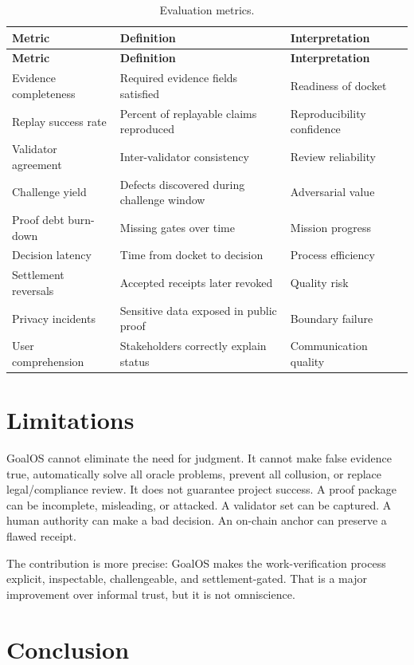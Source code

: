 \begin{longtable}{p{} p{} p{}}
\caption{Evaluation metrics.}\label{tab:metrics}\\
\toprule
\textbf{Metric} & \textbf{Definition} & \textbf{Interpretation}\\
\midrule
\endfirsthead
\toprule
\textbf{Metric} & \textbf{Definition} & \textbf{Interpretation}\\
\midrule
\endhead
Evidence completeness & Required evidence fields satisfied & Readiness of docket \\
Replay success rate & Percent of replayable claims reproduced & Reproducibility confidence \\
Validator agreement & Inter-validator consistency & Review reliability \\
Challenge yield & Defects discovered during challenge window & Adversarial value \\
Proof debt burn-down & Missing gates over time & Mission progress \\
Decision latency & Time from docket to decision & Process efficiency \\
Settlement reversals & Accepted receipts later revoked & Quality risk \\
Privacy incidents & Sensitive data exposed in public proof & Boundary failure \\
User comprehension & Stakeholders correctly explain status & Communication quality \\
\bottomrule
\end{longtable}

\section{Limitations}

GoalOS cannot eliminate the need for judgment. It cannot make false evidence true, automatically solve all oracle problems, prevent all collusion, or replace legal/compliance review. It does not guarantee project success. A proof package can be incomplete, misleading, or attacked. A validator set can be captured. A human authority can make a bad decision. An on-chain anchor can preserve a flawed receipt.

The contribution is more precise: GoalOS makes the work-verification process explicit, inspectable, challengeable, and settlement-gated. That is a major improvement over informal trust, but it is not omniscience.

\section{Conclusion}

